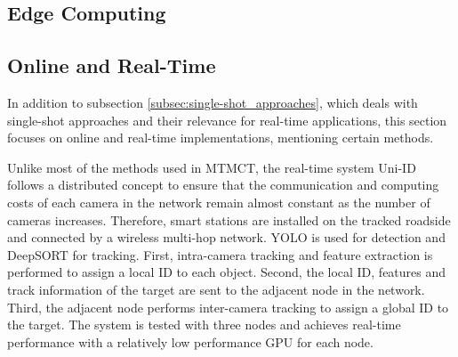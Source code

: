 
\subsection{Edge Computing}\label{subsec:edge_computing}

\subsection{Online and Real-Time}\label{subsec:online_and_real-time}
In addition to subsection \ref{subsec:single-shot_approaches}, which deals with single-shot approaches and their relevance for real-time applications, this section focuses on online and real-time implementations, mentioning certain methods.

Unlike most of the methods used in MTMCT, the real-time system Uni-ID~\cite{Chen22} follows a distributed concept to ensure that the communication and computing costs of each camera in the network remain almost constant as the number of cameras increases. Therefore, smart stations are installed on the tracked roadside and connected by a wireless multi-hop network. YOLO is used for detection and DeepSORT for tracking. First, intra-camera tracking and feature extraction is performed to assign a local ID to each object. Second, the local ID, features and track information of the target are sent to the adjacent node in the network. Third, the adjacent node performs inter-camera tracking to assign a global ID to the target. The system is tested with three nodes and achieves real-time performance with a relatively low performance GPU for each node.

